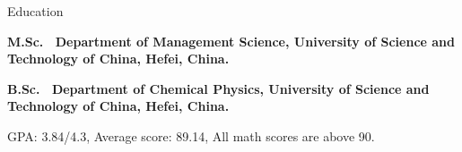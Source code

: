 \begin{rubric}{Education}

\entry*[2018 -- Now]%
	\textbf{M.Sc.~ Department of Management Science, University of Science and Technology of China, Hefei, China.} \par
%
\entry*[2014 -- 2018]%
	\textbf{B.Sc.~ Department of Chemical Physics, University of Science and Technology of China, Hefei, China.}\par
	
	GPA: 3.84/4.3, Average score: 89.14, All math scores are above 90.
\end{rubric}
